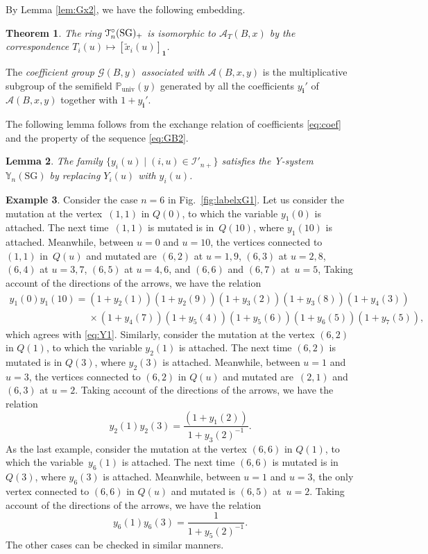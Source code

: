 \documentclass[11pt]{article}
\numberwithin{equation}{section}
\newtheorem{Theorem}{Theorem}[section]
\newtheorem{Lemma}[Theorem]{Lemma}
\theoremstyle{definition}
\newtheorem{Example}[Theorem]{Example}
\begin{document}
By Lemma \ref{lem:Gx2}, we have the following embedding.
\begin{Theorem}
\label{thm:GTiso}
The ring $\EuScript{T}^{\circ}_{n}(\mathrm{SG})_+$ is isomorphic to
$\mathcal{A}_T(B,x)$ by the correspondence
$T_i(u)\mapsto [\tilde{x}_i(u)]_{\mathbf{1}}$.
\end{Theorem}



The {\em coefficient group $\mathcal{G}(B,y)$
associated with $\mathcal{A}(B,x,y)$}
is the multiplicative subgroup of
the semif\/ield $\mathbb{P}_{\mathrm{univ}}(y)$ generated by all
the coef\/f\/icients $y_{\mathbf{i}}'$ of $\mathcal{A}(B,x,y)$
together with $1+y_{\mathbf{i}}'$.

The following lemma follows from the exchange relation of
coef\/f\/icients \eqref{eq:coef} and the property of the sequence
\eqref{eq:GB2}.


\begin{Lemma}
\label{lem:Gy2}
The family $\{ y_i(u)
\mid (i,u)\in \mathcal{I}'_{n+}\}$
satisfies the Y-system $\mathbb{Y}_{n}(\mathrm{SG})$
by replacing $Y_i(u)$ with $y_i(u)$.
\end{Lemma}

\begin{Example}
Consider the case $n=6$ in Fig.~\ref{fig:labelxG1}.
Let us consider the mutation at the vertex~$(1,1)$ in $Q(0)$,
to which  the variable $y_1(0)$ is attached.
The next time~$(1,1)$ is mutated is in~$Q(10)$,
where $y_1(10)$ is attached.
Meanwhile, between $u=0$ and $u=10$,
the vertices connected to $(1,1)$ in~$Q(u)$ and mutated
are
$(6,2)$ at $u=1,9$, $(6,3)$ at $u=2,8$, $(6,4)$ at $u=3,7$,
$(6,5)$ at $u=4,6$, and  $(6,6)$ and $(6,7)$ at~$u=5$,
Taking account of the directions of the arrows,
we have the relation
\begin{gather*}
y_1(0)y_1(10)=
(1+y_2(1))(1+y_2(9))(1+y_3(2))(1+y_3(8)) (1+y_4(3))\\
\phantom{y_1(0)y_1(10)=}{} \times (1+y_4(7))
(1+ y_5(4))(1+y_5(6)) (1+y_6(5))(1+y_7(5)),
\end{gather*}
which agrees with
\eqref{eq:Y1}.
Similarly, consider the mutation at the vertex $(6,2)$ in $Q(1)$,
to which  the variable $y_2(1)$ is attached.
The next time $(6,2)$ is mutated is in $Q(3)$,
where $y_2(3)$ is attached.
Meanwhile, between $u=1$ and $u=3$,
the vertices connected to $(6,2)$ in $Q(u)$ and mutated
are~$(2,1)$ and~$(6,3)$ at $u=2$.
Taking account of the directions of the arrows,
we have the relation
\[
y_2(1)y_2(3) =
\frac{(1+y_1(2))}{1+y_3(2)^{-1}}.
\]
As the last example, consider the mutation at the vertex $(6,6)$ in $Q(1)$,
to which  the variable~$y_6(1)$ is attached.
The next time $(6,6)$ is mutated is in $Q(3)$,
where $y_6(3)$ is attached.
Meanwhile, between $u=1$ and $u=3$,
the only vertex connected to $(6,6)$ in $Q(u)$ and mutated
is  $(6,5)$ at~$u=2$.
Taking account of the directions of the arrows,
we have the relation
\[
y_6(1)y_6(3) =
\frac{1}{1+y_5(2)^{-1}}.
\]
The other cases can be checked in similar manners.
\end{Example}
\end{document}
